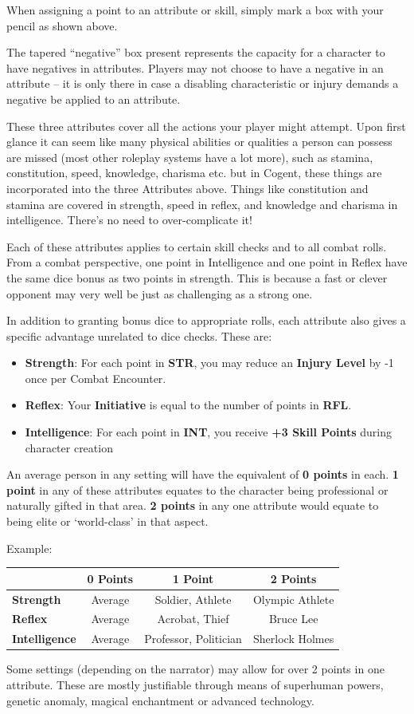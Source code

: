 When assigning a point to an attribute or skill, simply mark a box with your pencil as shown above.

The tapered “negative” box present represents the capacity for a character to have negatives in attributes. Players may not choose to have a negative in an attribute – it is only there in case a disabling characteristic or injury demands a negative be applied to an attribute.

These three attributes cover all the actions your player might attempt. Upon first glance it can seem like many physical abilities or qualities a person can possess are missed (most other roleplay systems have a lot more), such as stamina, constitution, speed, knowledge, charisma etc. but in Cogent, these things are incorporated into the three Attributes above. Things like constitution and stamina are covered in strength, speed in reflex, and knowledge and charisma in intelligence. There’s no need to over-complicate it!

Each of these attributes applies to certain skill checks and to all combat rolls. From a combat perspective, one point in Intelligence and one point in Reflex have the same dice bonus as two points in strength. This is because a fast or clever opponent may very well be just as challenging as a strong one.

In addition to granting bonus dice to appropriate rolls, each attribute also gives a specific advantage unrelated to dice checks. These are:

\begin{itemize}
    \item \textbf{Strength}: For each point in \textbf{STR}, you may reduce an \textbf{Injury Level} by -1 once per Combat Encounter.
    \item \textbf{Reflex}: Your \textbf{Initiative }is equal to the number of points in \textbf{RFL}.
    \item \textbf{Intelligence}: For each point in \textbf{INT}, you receive \textbf{+3 Skill Points} during character creation
\end{itemize}

An average person in any setting will have the equivalent of \textbf{0 points} in each. \textbf{1 point} in any of these attributes equates to the character being professional or naturally gifted in that area. \textbf{2 points} in any one attribute would equate to being elite or ‘world-class’ in that aspect.

Example:

\begin{center}
    \begin{tabular}{|l|c c c|} 
     \hline
       & \textbf{0 Points} & \textbf{1 Point} & \textbf{2 Points} \\ 
     \hline
     \textbf{Strength} & Average & Soldier, Athlete & Olympic Athlete \\ 
     \textbf{Reflex} & Average & Acrobat, Thief & Bruce Lee \\
     \textbf{Intelligence} & Average & Professor, Politician & Sherlock Holmes \\
     \hline
    \end{tabular}
\end{center}

Some settings (depending on the narrator) may allow for over 2 points in one attribute. These are mostly justifiable through means of superhuman powers, genetic anomaly, magical enchantment or advanced technology.
